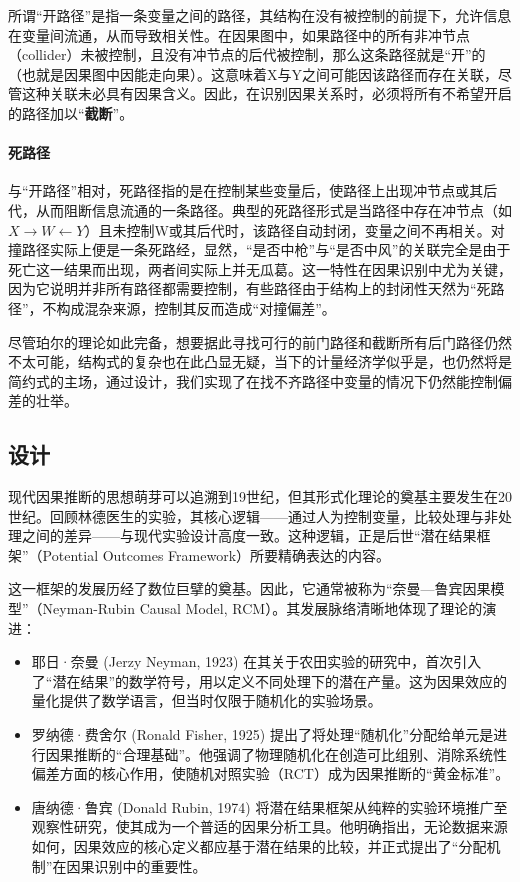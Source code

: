 所谓“开路径”是指一条变量之间的路径，其结构在没有被控制的前提下，允许信息在变量间流通，从而导致相关性。在因果图中，如果路径中的所有非冲节点（collider）未被控制，且没有冲节点的后代被控制，那么这条路径就是“开”的（也就是因果图中因能走向果）。这意味着X与Y之间可能因该路径而存在关联，尽管这种关联未必具有因果含义。因此，在识别因果关系时，必须将所有不希望开启的路径加以“\textbf{截断}”。

\paragraph*{死路径}

与“开路径”相对，死路径指的是在控制某些变量后，使路径上出现冲节点或其后代，从而阻断信息流通的一条路径。典型的死路径形式是当路径中存在冲节点（如 $X \rightarrow W \leftarrow Y$）且未控制W或其后代时，该路径自动封闭，变量之间不再相关。对撞路径实际上便是一条死路经，显然，“是否中枪”与“是否中风”的关联完全是由于死亡这一结果而出现，两者间实际上并无瓜葛。这一特性在因果识别中尤为关键，因为它说明并非所有路径都需要控制，有些路径由于结构上的封闭性天然为“死路径”，不构成混杂来源，控制其反而造成“对撞偏差”。

尽管珀尔的理论如此完备，想要据此寻找可行的前门路径和截断所有后门路径仍然不太可能，结构式的复杂也在此凸显无疑，当下的计量经济学似乎是，也仍然将是简约式的主场，通过设计，我们实现了在找不齐路径中变量的情况下仍然能控制偏差的壮举。

\subsection{设计}

现代因果推断的思想萌芽可以追溯到19世纪，但其形式化理论的奠基主要发生在20世纪。回顾林德医生的实验，其核心逻辑——通过人为控制变量，比较处理与非处理之间的差异——与现代实验设计高度一致。这种逻辑，正是后世“潜在结果框架”（Potential Outcomes Framework）所要精确表达的内容。

这一框架的发展历经了数位巨擘的奠基。因此，它通常被称为“奈曼—鲁宾因果模型”（Neyman-Rubin Causal Model, RCM）。其发展脉络清晰地体现了理论的演进：

\begin{itemize}
    \item 耶日·奈曼 (Jerzy Neyman, 1923) 在其关于农田实验的研究中，首次引入了“潜在结果”的数学符号，用以定义不同处理下的潜在产量。这为因果效应的量化提供了数学语言，但当时仅限于随机化的实验场景。
    \item 罗纳德·费舍尔 (Ronald Fisher, 1925) 提出了将处理“随机化”分配给单元是进行因果推断的“合理基础”。他强调了物理随机化在创造可比组别、消除系统性偏差方面的核心作用，使随机对照实验（RCT）成为因果推断的“黄金标准”。
    \item 唐纳德·鲁宾 (Donald Rubin, 1974) 将潜在结果框架从纯粹的实验环境推广至观察性研究，使其成为一个普适的因果分析工具。他明确指出，无论数据来源如何，因果效应的核心定义都应基于潜在结果的比较，并正式提出了“分配机制”在因果识别中的重要性。
\end{itemize}

